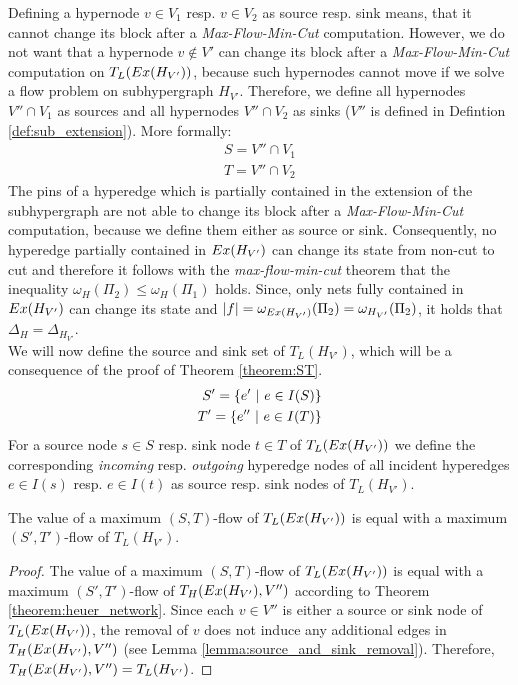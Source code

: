 Defining a hypernode $v \in V_1$ resp. $v \in V_2$ as source resp. sink means, that
it cannot change its block after a \emph{Max-Flow-Min-Cut} computation.
However, we do not want that a hypernode $v \notin V'$ can change its block after
a \emph{Max-Flow-Min-Cut} computation on $T_L(Ex(H_{V'}))$, because such hypernodes
cannot move if we solve a flow problem on subhypergraph $H_{V'}$. Therefore, we define
all hypernodes $V'' \cap V_1$ as sources and all hypernodes $V'' \cap V_2$ as sinks 
($V''$ is defined in Defintion \ref{def:sub_extension}). More formally:
\begin{align}
S = V'' \cap V_1 \label{S_border_hyperedges}\\
T = V'' \cap V_2 \label{T_border_hyperedges}
\end{align}
The pins of a hyperedge which is partially contained in the extension
of the subhypergraph are not able to change its block after a \emph{Max-Flow-Min-Cut}
computation, because we define them either as source or sink. Consequently, 
no hyperedge partially contained in $Ex(H_{V'})$ can change its state 
from non-cut to cut and therefore it follows with the \emph{max-flow-min-cut} 
theorem \cite{ford1956maximal} that the inequality $\omega_H(\Pi_2) \le \omega_H(\Pi_1)$
holds. Since, only nets fully contained in $Ex(H_{V'})$ can change its state and
$|f| = \omega_{Ex(H_{V'})}(\Pi_2) = \omega_{H_{V'}}(\Pi_2)$, it holds that
$\Delta_H = \Delta_{H_{V'}}$. \\
We will now define the source and sink set of $T_L(H_{V'})$, which will be a consequence
of the proof of Theorem \ref{theorem:ST}.
\begin{align}
S' = \{e'\ |\ e \in I(S)\} \label{eq:S}\\
T' = \{e''\ |\ e \in I(T)\} \label{eq:T}
\end{align}
For a source node $s \in S$ resp. sink node $t \in T$ of $T_L(Ex(H_{V'}))$ 
we define the corresponding \emph{incoming} resp. \emph{outgoing}
hyperedge nodes of all incident hyperedges $e \in I(s)$ resp. $e \in I(t)$ as 
source resp. sink nodes of $T_L(H_{V'})$.

\begin{theorem}
\label{theorem:ST}
The value of a maximum $(S,T)$-flow of $T_L(Ex(H_{V'}))$ is equal with
a maximum $(S',T')$-flow of $T_L(H_{V'})$.
\end{theorem}

\begin{proof}
The value of a maximum $(S,T)$-flow of $T_L(Ex(H_{V'}))$ is equal with a maximum
$(S',T')$-flow of $T_H(Ex(H_{V'}),V'')$ according to Theorem \ref{theorem:heuer_network}.
Since each $v \in V''$ is either a source or sink node of $T_L(Ex(H_{V'}))$, the 
removal of $v$ does not induce any additional edges in $T_H(Ex(H_{V'}),V'')$
(see Lemma \ref{lemma:source_and_sink_removal}). Therefore,
$T_H(Ex(H_{V'}),V'') = T_L(H_{V'})$.
\end{proof}

